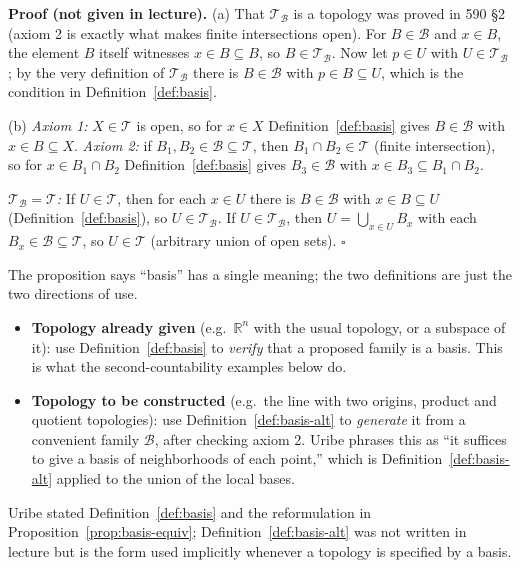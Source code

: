 \documentclass[11pt]{report}
\renewenvironment{proof}[1][Proof]{\noindent\textbf{#1.} }{\hfill$\square$\par\vspace{5pt}}
\begin{document}
\begin{proof}[Proof (not given in lecture)]
(a) That $\mathcal{T}_{\mathcal{B}}$ is a topology was proved in 590 \S2 (axiom 2 is exactly what makes finite intersections open). For $B \in \mathcal{B}$ and $x \in B$, the element $B$ itself witnesses $x \in B \subseteq B$, so $B \in \mathcal{T}_{\mathcal{B}}$. Now let $p \in U$ with $U \in \mathcal{T}_{\mathcal{B}}$; by the very definition of $\mathcal{T}_{\mathcal{B}}$ there is $B \in \mathcal{B}$ with $p \in B \subseteq U$, which is the condition in Definition~\ref{def:basis}.

(b) \emph{Axiom 1:} $X \in \mathcal{T}$ is open, so for $x \in X$ Definition~\ref{def:basis} gives $B \in \mathcal{B}$ with $x \in B \subseteq X$. \emph{Axiom 2:} if $B_1, B_2 \in \mathcal{B} \subseteq \mathcal{T}$, then $B_1 \cap B_2 \in \mathcal{T}$ (finite intersection), so for $x \in B_1 \cap B_2$ Definition~\ref{def:basis} gives $B_3 \in \mathcal{B}$ with $x \in B_3 \subseteq B_1 \cap B_2$.

\emph{$\mathcal{T}_{\mathcal{B}} = \mathcal{T}$:} If $U \in \mathcal{T}$, then for each $x \in U$ there is $B \in \mathcal{B}$ with $x \in B \subseteq U$ (Definition~\ref{def:basis}), so $U \in \mathcal{T}_{\mathcal{B}}$. If $U \in \mathcal{T}_{\mathcal{B}}$, then $U = \bigcup_{x \in U} B_x$ with each $B_x \in \mathcal{B} \subseteq \mathcal{T}$, so $U \in \mathcal{T}$ (arbitrary union of open sets).
\end{proof}

\begin{rembox}\label{rem:which-definition-use-when}
The proposition says ``basis'' has a single meaning; the two definitions are just the two directions of use.
\begin{itemize}
    \item \textbf{Topology already given} (e.g.\ $\mathbb{R}^n$ with the usual topology, or a subspace of it): use Definition~\ref{def:basis} to \emph{verify} that a proposed family is a basis. This is what the second-countability examples below do.
    \item \textbf{Topology to be constructed} (e.g.\ the line with two origins, product and quotient topologies): use Definition~\ref{def:basis-alt} to \emph{generate} it from a convenient family $\mathcal{B}$, after checking axiom 2. Uribe phrases this as ``it suffices to give a basis of neighborhoods of each point,'' which is Definition~\ref{def:basis-alt} applied to the union of the local bases.
\end{itemize}
Uribe stated Definition~\ref{def:basis} and the reformulation in Proposition~\ref{prop:basis-equiv}; Definition~\ref{def:basis-alt} was not written in lecture but is the form used implicitly whenever a topology is specified by a basis.
\end{rembox}
\end{document}
